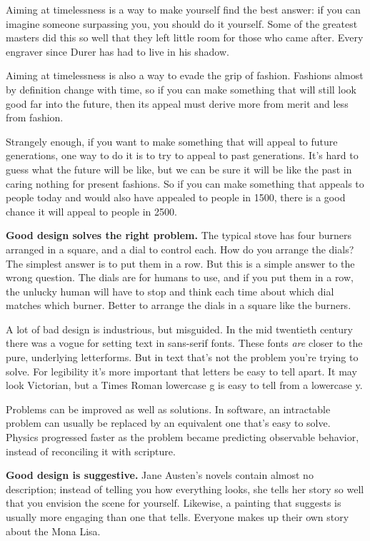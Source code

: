 \documentclass[12pt]{book}
\begin{document}
Aiming at timelessness is a way to make yourself find the best answer:
if you can imagine someone surpassing you, you should do it yourself.
Some of the greatest masters did this so well that they left little room
for those who came after. Every engraver since Durer has had to live in
his shadow.

Aiming at timelessness is also a way to evade the grip of fashion.
Fashions almost by definition change with time, so if you can make
something that will still look good far into the future, then its appeal
must derive more from merit and less from fashion.

Strangely enough, if you want to make something that will appeal to
future generations, one way to do it is to try to appeal to past
generations. It's hard to guess what the future will be like, but we can
be sure it will be like the past in caring nothing for present fashions.
So if you can make something that appeals to people today and would also
have appealed to people in 1500, there is a good chance it will appeal
to people in 2500.

\textbf{Good design solves the right problem.} The typical stove has
four burners arranged in a square, and a dial to control each. How do
you arrange the dials? The simplest answer is to put them in a row. But
this is a simple answer to the wrong question. The dials are for humans
to use, and if you put them in a row, the unlucky human will have to
stop and think each time about which dial matches which burner. Better
to arrange the dials in a square like the burners.

A lot of bad design is industrious, but misguided. In the mid twentieth
century there was a vogue for setting text in sans-serif fonts. These
fonts \emph{are} closer to the pure, underlying letterforms. But in text
that's not the problem you're trying to solve. For legibility it's more
important that letters be easy to tell apart. It may look Victorian, but
a Times Roman lowercase g is easy to tell from a lowercase y.

Problems can be improved as well as solutions. In software, an
intractable problem can usually be replaced by an equivalent one that's
easy to solve. Physics progressed faster as the problem became
predicting observable behavior, instead of reconciling it with
scripture.

\textbf{Good design is suggestive.} Jane Austen's novels contain almost
no description; instead of telling you how everything looks, she tells
her story so well that you envision the scene for yourself. Likewise, a
painting that suggests is usually more engaging than one that tells.
Everyone makes up their own story about the Mona Lisa.
\end{document}

